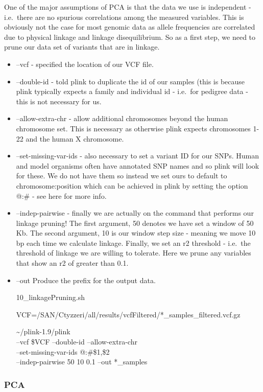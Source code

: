 \documentclass[
]{article}
\begin{document}
One of the major assumptions of PCA is that the data we use is
independent - i.e.~there are no spurious correlations among the measured
variables. This is obviously not the case for most genomic data as
allele frequencies are correlated due to physical linkage and linkage
disequilibrium. So as a first step, we need to prune our data set of
variants that are in linkage.

\begin{itemize}
\item
  --vcf - specified the location of our VCF file.
\item
  --double-id - told plink to duplicate the id of our samples (this is
  because plink typically expects a family and individual id - i.e.~for
  pedigree data - this is not necessary for us.
\item
  --allow-extra-chr - allow additional chromosomes beyond the human
  chromosome set. This is necessary as otherwise plink expects
  chromosomes 1-22 and the human X chromosome.
\item
  --set-missing-var-ids - also necessary to set a variant ID for our
  SNPs. Human and model organisms often have annotated SNP names and so
  plink will look for these. We do not have them so instead we set ours
  to default to chromosome:position which can be achieved in plink by
  setting the option @:\# - see here for more info.
\item
  --indep-pairwise - finally we are actually on the command that
  performs our linkage pruning! The first argument, 50 denotes we have
  set a window of 50 Kb. The second argument, 10 is our window step size
  - meaning we move 10 bp each time we calculate linkage. Finally, we
  set an r2 threshold - i.e.~the threshold of linkage we are willing to
  tolerate. Here we prune any variables that show an r2 of greater than
  0.1.
\item
  --out Produce the prefix for the output data.

  10\_linkagePruning.sh

  VCF=/SAN/Ctyzzeri/all/results/vcfFiltered/*\_samples\_filtered.vcf.gz

  \textasciitilde/plink-1.9/plink\\
  --vcf \$VCF --double-id --allow-extra-chr\\
  --set-missing-var-ids @:\#\$1,\$2\\
  --indep-pairwise 50 10 0.1 --out *\_samples
\end{itemize}

\hypertarget{pca}{%
\subsubsection{PCA}\label{pca}}
\end{document}
